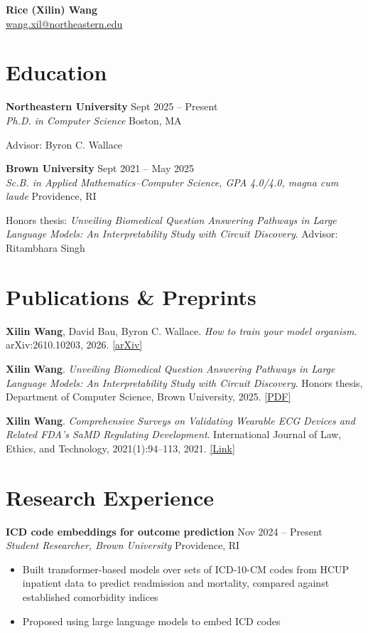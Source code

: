 \documentclass[10pt,letterpaper]{article}
\newcommand{\entry}[4]{%
  \textbf{#1} \hfill #2\\
  \textit{#3} \hfill #4\par\vspace{2pt}}
\newcommand{\me}{\textbf{Xilin Wang}}
\begin{document}
\begin{center}
  {\LARGE\bfseries Rice (Xilin) Wang}\\[4pt]
  \href{mailto:wang.xil@northeastern.edu}{wang.xil@northeastern.edu}
\end{center}

\section{Education}
\entry{Northeastern University}{Sept 2025 -- Present}{Ph.D. in Computer Science}{Boston, MA}
Advisor: Byron C. Wallace
\vspace{6pt}

\entry{Brown University}{Sept 2021 -- May 2025}{Sc.B. in Applied Mathematics--Computer Science, GPA 4.0/4.0, \textup{magna cum laude}}{Providence, RI}
Honors thesis: \textit{Unveiling Biomedical Question Answering Pathways in Large Language Models: An Interpretability
Study with Circuit Discovery}. Advisor: Ritambhara Singh

\section{Publications \& Preprints}
\begin{enumerate}[leftmargin=1.6em, itemsep=4pt, label={[\arabic*]}]
  \item \me, David Bau, Byron C. Wallace.
        \textit{How to train your model organism}.
        arXiv:2610.10203, 2026.
        \href{https://arxiv.org/abs/2610.10203}{[arXiv]}
  \item \me.
        \textit{Unveiling Biomedical Question Answering Pathways in Large Language Models: An Interpretability Study with
        Circuit Discovery}. Honors thesis, Department of Computer Science, Brown University, 2025.
        \href{https://cs.brown.edu/media/filer_public/a1/b1/a1b1e101-8b3e-4b3b-bf15-ced854e5032e/wang_xilin_final_thesis.pdf}{[PDF]}
  \item \me.
        \textit{Comprehensive Surveys on Validating Wearable ECG Devices and Related FDA's SaMD Regulating Development}.
        International Journal of Law, Ethics, and Technology, 2021(1):94--113, 2021.
        \href{https://ijlet.org/a116/}{[Link]}
\end{enumerate}

\section{Research Experience}
\entry{ICD code embeddings for outcome prediction}{Nov 2024 -- Present}{Student Researcher, Brown University}{Providence, RI}
\begin{itemize}
  \item Built transformer-based models over sets of ICD-10-CM codes from HCUP inpatient data to predict readmission and
        mortality, compared against established comorbidity indices
  \item Proposed using large language models to embed ICD codes
\end{itemize}
\vspace{4pt}
\end{document}
